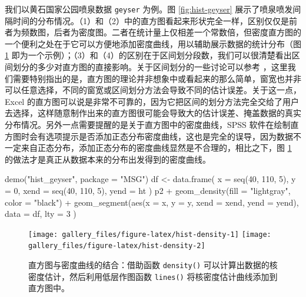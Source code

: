 \documentclass[
  b5paper,
  UTF8,twoside]{book}
\newenvironment{Shaded}{\begin{snugshade}}{\end{snugshade}}
\newcommand{\AttributeTok}[1]{\textcolor[rgb]{0.77,0.63,0.00}{#1}}
\newcommand{\DecValTok}[1]{\textcolor[rgb]{0.00,0.00,0.81}{#1}}
\newcommand{\FunctionTok}[1]{\textcolor[rgb]{0.00,0.00,0.00}{#1}}
\newcommand{\NormalTok}[1]{#1}
\newcommand{\OtherTok}[1]{\textcolor[rgb]{0.56,0.35,0.01}{#1}}
\newcommand{\SpecialCharTok}[1]{\textcolor[rgb]{0.00,0.00,0.00}{#1}}
\newcommand{\StringTok}[1]{\textcolor[rgb]{0.31,0.60,0.02}{#1}}
\begin{document}
我们以黄石国家公园喷泉数据 \texttt{geyser} \citep{Venables02} 为例。图 \ref{fig:hist-geyser} 展示了喷泉喷发间隔时间的分布情况。（1）和（2）中的直方图看起来形状完全一样，区别仅仅是前者为频数图，后者为密度图。二者在统计量上仅相差一个常数倍，但密度直方图的一个便利之处在于它可以方便地添加密度曲线，用以辅助展示数据的统计分布（图 \ref{fig:hist-density} 即为一个示例）；（3）和（4）的区别在于区间划分段数，我们可以很清楚看出区间划分的多少对直方图的直接影响。关于区间划分的一些讨论可以参考 \citet{Venables02}，这里我们需要特别指出的是，直方图的理论并非想象中或看起来的那么简单，窗宽也并非可以任意选择，不同的窗宽或区间划分方法会导致不同的估计误差。关于这一点，Excel 的直方图可以说是非常不可靠的，因为它把区间的划分方法完全交给了用户去选择，这样随意制作出来的直方图很可能会导致大的估计误差、掩盖数据的真实分布情况。另外一点需要提醒的是关于直方图中的密度曲线，SPSS 软件在绘制直方图时会有选项提示是否添加正态分布密度曲线，这也是完全的误导，因为数据不一定来自正态分布，添加正态分布的密度曲线显然是不合理的，相比之下，图 \ref{fig:hist-density} 的做法才是真正从数据本来的分布出发得到的密度曲线。





\begin{Shaded}
\begin{Highlighting}[]
\FunctionTok{demo}\NormalTok{(}\StringTok{"hist\_geyser"}\NormalTok{, }\AttributeTok{package =} \StringTok{"MSG"}\NormalTok{)}
\NormalTok{df }\OtherTok{\textless{}{-}} \FunctionTok{data.frame}\NormalTok{(}
  \AttributeTok{x =} \FunctionTok{seq}\NormalTok{(}\DecValTok{40}\NormalTok{, }\DecValTok{110}\NormalTok{, }\DecValTok{5}\NormalTok{), }\AttributeTok{y =} \DecValTok{0}\NormalTok{,}
  \AttributeTok{xend =} \FunctionTok{seq}\NormalTok{(}\DecValTok{40}\NormalTok{, }\DecValTok{110}\NormalTok{, }\DecValTok{5}\NormalTok{), }\AttributeTok{yend =}\NormalTok{ ht}
\NormalTok{)}
\NormalTok{p2 }\SpecialCharTok{+} \FunctionTok{geom\_density}\NormalTok{(}\AttributeTok{fill =} \StringTok{"lightgray"}\NormalTok{, }\AttributeTok{color =} \StringTok{"black"}\NormalTok{) }\SpecialCharTok{+}
  \FunctionTok{geom\_segment}\NormalTok{(}\FunctionTok{aes}\NormalTok{(}\AttributeTok{x =}\NormalTok{ x, }\AttributeTok{y =}\NormalTok{ y, }\AttributeTok{xend =}\NormalTok{ xend, }\AttributeTok{yend =}\NormalTok{ yend),}
    \AttributeTok{data =}\NormalTok{ df, }\AttributeTok{lty =} \DecValTok{3}
\NormalTok{  )}
\end{Highlighting}
\end{Shaded}

\begin{figure}

{\centering \texttt{[image: gallery\_files/figure-latex/hist-density-1]} \texttt{[image: gallery\_files/figure-latex/hist-density-2]} 

}

\caption[直方图与密度曲线的结合]{直方图与密度曲线的结合：借助函数 \texttt{density()} 可以计算出数据的核密度估计，然后利用低层作图函数 \texttt{lines()} 将核密度估计曲线添加到直方图中。}\label{fig:hist-density}
\end{figure}
\end{document}
